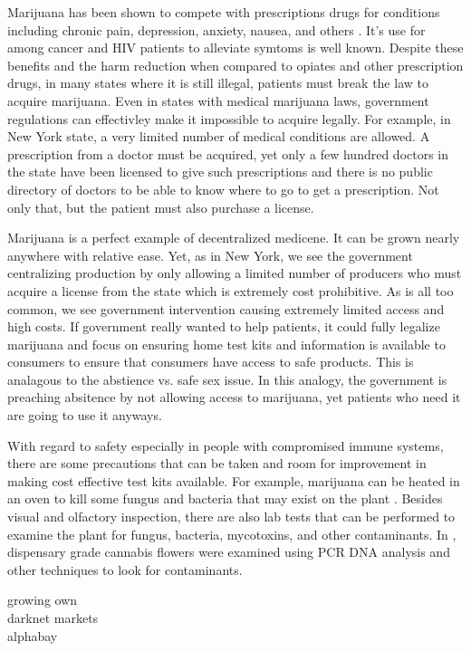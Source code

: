 \documentclass{article}
\begin{document}
Marijuana has been shown to compete with prescriptions drugs for conditions including chronic pain, depression, anxiety, nausea, and others \cite{bradford2016medical}. It's use for among cancer and HIV patients to alleviate symtoms is well known. Despite these benefits and the harm reduction when compared to opiates and other prescription drugs, in many states where it is still illegal, patients must break the law to acquire marijuana. Even in states with medical marijuana laws, government regulations can effectivley make it impossible to acquire legally. For example, in New York state, a very limited number of medical conditions are allowed. A prescription from a doctor must be acquired, yet only a few hundred doctors in the state have been licensed to give such prescriptions and there is no public directory of doctors to be able to know where to go to get a prescription. Not only that, but the patient must also purchase a license. 

Marijuana is a perfect example of decentralized medicene. It can be grown nearly anywhere with relative ease. Yet, as in New York, we see the government centralizing production by only allowing a limited number of producers who must acquire a license from the state which is extremely cost prohibitive. As is all too common, we see government intervention causing extremely limited access and high costs. If government really wanted to help patients, it could fully legalize marijuana and focus on ensuring home test kits and information is available to consumers to ensure that consumers have access to safe products. This is analagous to the abstience vs. safe sex issue. In this analogy, the government is preaching absitence by not allowing access to marijuana, yet patients who need it are going to use it anyways.

With regard to safety especially in people with compromised immune systems, there are some precautions that can be taken and room for improvement in making cost effective test kits available. For example, marijuana can be heated in an oven to kill some fungus and bacteria that may exist on the plant \cite{russo2014handbook}. Besides visual and olfactory inspection, there are also lab tests that can be performed to examine the plant for fungus, bacteria, mycotoxins, and other contaminants. In \cite{mckernan2015cannabis}, dispensary grade cannabis flowers were examined using PCR DNA analysis and other techniques to look for contaminants. 

growing own\\
darknet markets\\
alphabay\\
\end{document}
